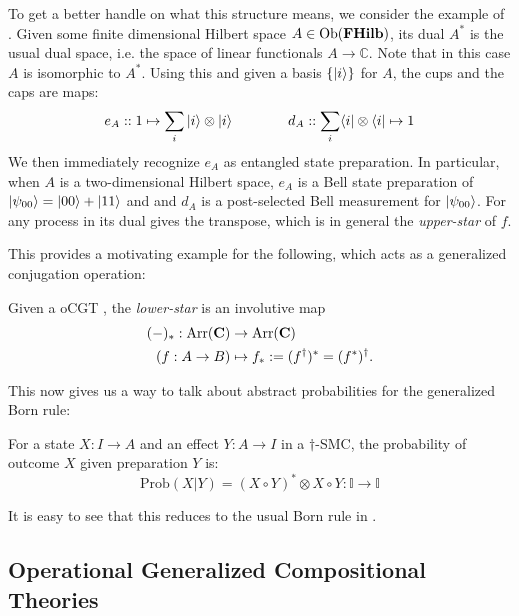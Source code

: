 \begin{example}
To get a better handle on what this structure means, we consider the example of . Given some finite dimensional Hilbert space $A\in\mbox{Ob}(\mathbf{FHilb})$, its dual $A^*$ is the usual dual space, i.e. the space of linear functionals $A\to \mathbb{C}$. Note that in this case $A$ is isomorphic to $A^*$. Using this and given a basis $\{ | i \rangle \}$ for $A$, the cups and the caps are maps:
\begin{equation}
e_A :: 1\mapsto \sum_i| i \rangle\otimes| i \rangle
\qquad\qquad
d_A :: \sum_i\langle i |\otimes\langle i | \mapsto 1
\end{equation}
We then immediately recognize $e_A$ as entangled state preparation. In particular, when $A$ is a two-dimensional Hilbert space, $e_A$ is a Bell state preparation of $| \psi_{00} \rangle=| 00 \rangle+| 11 \rangle$ and  and $d_A$ is a post-selected Bell measurement for $| \psi_{00} \rangle$. For any process in  its dual gives the transpose, which is in general the \emph{upper-star} of $f$.
\end{example}

This provides a motivating example for the following, which acts as a generalized conjugation operation:

\begin{defn}
Given a oCGT , the \emph{lower-star} is an involutive map 
\begin{align*}
(-)_*:\mbox{Arr}(\mathbf{C})&\to\mbox{Arr}(\mathbf{C}) \\
\left(f:A\to B\right) &\mapsto f_*:=(f^\dagger)^*=(f^*)^\dagger.
\end{align*}
\end{defn}

This now gives us a way to talk about abstract probabilities for the generalized Born rule:
\begin{defn}
For a state $X:I\to A$ and an effect $Y:A\to I$ in a $\dagger$-SMC, the probability of outcome $X$ given preparation $Y$ is:
\begin{equation}
\mbox{Prob}(X|Y) = (X\circ Y)^*\otimes X\circ Y:\mathbb{I}\to\mathbb{I}
\end{equation}
\end{defn}
\noindent It is easy to see that this reduces to the usual Born rule in .

\subsection{Operational Generalized Compositional Theories}


